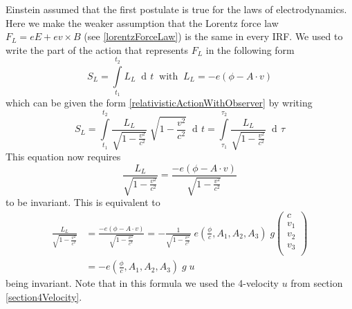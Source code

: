 \documentclass{article}
\DeclareMathOperator{\dd}{d\!}
\begin{document}
Einstein assumed that the first postulate is true for the laws of electrodynamics.
Here we make the weaker assumption that the Lorentz force law $F_L = eE + ev \times B$ (see \ref{lorentzForceLaw}) is the same in every IRF.
We used to write the part of the action that represents $F_L$ in the following form
\begin{equation}
    S_L = \int\limits_{t_1}^{t_2} L_L \; \dd t \;\; \text{with} \;\; L_L = - e (\phi - A \cdot v)
\end{equation}
which can be given the form \ref{relativisticActionWithObserver} by writing
\begin{equation}
    S_L = \int\limits_{t_1}^{t_2} \frac{L_L}{\sqrt{1-\frac{v^2}{c^2}}} \; \sqrt{1-\frac{v^2}{c^2}} \; \dd t
        = \int\limits_{\tau_1}^{\tau_2} \frac{L_L}{\sqrt{1-\frac{v^2}{c^2}}} \;  \dd \tau
\end{equation}
This equation now requires
\begin{equation}
    \frac{L_L}{\sqrt{1-\frac{v^2}{c^2}}} = \frac{- e (\phi - A \cdot v)}{\sqrt{1-\frac{v^2}{c^2}}}
\end{equation}
to be invariant.
This is equivalent to
\begin{align}
    \frac{L_L}{\sqrt{1-\frac{v^2}{c^2}}} &= \frac{- e (\phi - A \cdot v)}{\sqrt{1-\frac{v^2}{c^2}}}  = - \frac{1}{\sqrt{1-\frac{v^2}{c^2}}} \; e (\frac{\phi}{c} , A_1, A_2, A_3) \; g
    \left(\begin{array}{c}
      c \\
      v_1\\
      v_2\\
      v_3\\
    \end{array} \right) \nonumber \\
    &= - e (\frac{\phi}{c} , A_1, A_2, A_3) \; g \; u \label{invariantLorentzForceLagrangian}
\end{align}
being invariant.
Note that in this formula we used the 4-velocity $u$ from section \ref{section4Velocity}.
\end{document}
